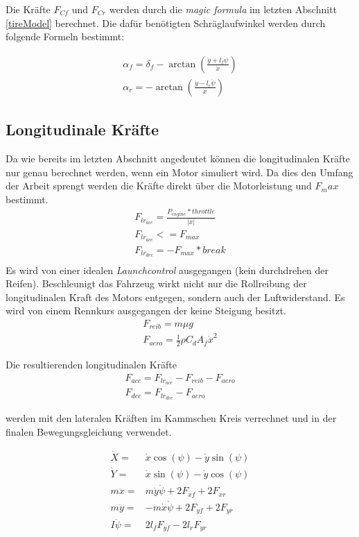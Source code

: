 \documentclass{like}
\begin{document}
Die Kräfte \(F_{Cf}\) und \(F_{Cr}\) werden durch die \textit{magic formula} im letzten Abschnitt \ref{tireModel} berechnet.
Die dafür benötigten Schräglaufwinkel werden durch folgende Formeln bestimmt:

\begin{eqnarray}
\alpha_f = \delta_f - \arctan(\frac{\dot{y} + l_f \dot{\psi}}{\dot{x}}) \\
\alpha_r = - \arctan(\frac{\dot{y} - l_r \dot{\psi}}{\dot{x}})
\end{eqnarray}

\subsection*{Longitudinale Kräfte}
Da wie bereits im letzten Abschnitt angedeutet können die longitudinalen Kräfte nur genau berechnet werden, wenn ein Motor simuliert wird. Da dies den Umfang der Arbeit sprengt werden die Kräfte direkt über die Motorleistung und \(F_max\) bestimmt.
\begin{eqnarray}
	F_{lr_{acc}} = \frac{P_{engine} * throttle }{|\dot{x}|} \\
	F_{lr_{acc}} <= F_{max} \\
	F_{lr_{dec}} = - F_{max} * break\\
\end{eqnarray}
Es wird von einer idealen \textit{Launchcontrol} ausgegangen (kein durchdrehen der Reifen).
Beschleunigt das Fahrzeug wirkt nicht nur die Rollreibung der longitudinalen Kraft des Motors entgegen, sondern auch der Luftwiderstand. Es wird von einem Rennkurs ausgegangen der keine Steigung besitzt.
\begin{eqnarray}
F_{reib} = m \mu g \\
F_{aero} = \frac{1}{2} \rho C_d A_f \dot{x}^2
\end{eqnarray}

Die resultierenden longitudinalen Kräfte 
\begin{eqnarray}
F_{acc} = F_{lr_{acc}} - F_{reib} - F_{aero}\\
F_{dec} = F_{lr_{dec}} - F_{aero}
\end{eqnarray}

werden mit den lateralen Kräften im Kammschen Kreis verrechnet und in der finalen Bewegungsgleichung verwendet.

\begin{eqnarray}
\dot{X} =& \dot{x} \cos(\psi) - \dot{y} \sin(\psi) \\
\dot{Y} =& \dot{x} \sin(\psi) - \dot{y} \cos(\psi) \\
m \ddot{x} =& m \dot{y} \dot{\psi} + 2F_{xf} + 2 F_{xr}\\
m \ddot{y} =& - m \dot{x} \dot{\psi} + 2 F_{yf} + 2 F_{yr} \\
I \ddot{\psi} =& 2 l_f F_{yf} - 2 l_r F_{yr} \\
\end{eqnarray}
\end{document}
